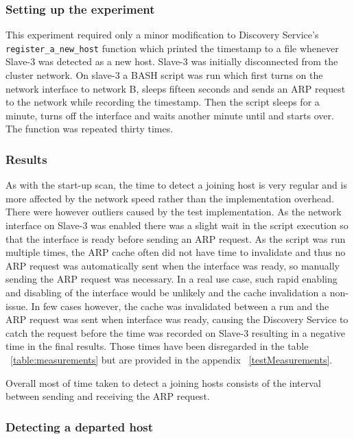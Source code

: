 \subsubsection*{Setting up the experiment}

This experiment required only a minor modification to Discovery Service's \verb|register_a_new_host| function which printed the timestamp to a file whenever Slave-3 was detected as a new host. Slave-3 was initially disconnected from the cluster network. On slave-3 a BASH script was run which first turns on the network interface to network B, sleeps fifteen seconds and sends an ARP request to the network while recording the timestamp. Then the script sleeps for a minute, turns off the interface and waits another minute until and starts over. The function was repeated thirty times.

\subsubsection*{Results}

As with the start-up scan, the time to detect a joining host is very regular and is more affected by the network speed rather than the implementation overhead. There were however outliers caused by the test implementation. As the network interface on Slave-3 was enabled there was a slight wait in the script execution so that the interface is ready before sending an ARP request. As the script was run multiple times, the ARP cache often did not have time to invalidate and thus no ARP request was automatically sent when the interface was ready, so manually sending the ARP request was necessary. In a real use case, such rapid enabling and disabling of the interface would be unlikely and the cache invalidation a non-issue. In few cases however, the cache was invalidated between a run and the ARP request was sent when interface was ready, causing the Discovery Service to catch the request before the time was recorded on Slave-3 resulting in a negative time in the final results. Those times have been disregarded in the table ~\ref{table:measurements} but are provided in the appendix ~\ref{testMeasurements}.

Overall most of time taken to detect a joining hosts consists of the interval between sending and receiving the ARP request.

\subsubsection{Detecting a departed host}

